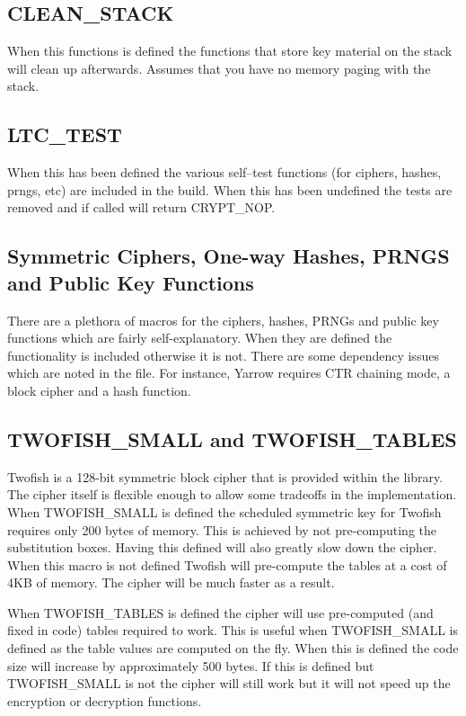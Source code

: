 \documentclass[a4paper]{book}
\begin{document}
\subsection{CLEAN\_STACK}
When this functions is defined the functions that store key material on the stack will clean up afterwards.  
Assumes that you have no memory paging with the stack.

\subsection{LTC\_TEST}
When this has been defined the various self--test functions (for ciphers, hashes, prngs, etc) are included in the build.
When this has been undefined the tests are removed and if called will return CRYPT\_NOP.

\subsection{Symmetric Ciphers, One-way Hashes, PRNGS and Public Key Functions}
There are a plethora of macros for the ciphers, hashes, PRNGs and public key functions which are fairly 
self-explanatory.  When they are defined the functionality is included otherwise it is not.  There are some 
dependency issues which are noted in the file.  For instance, Yarrow requires CTR chaining mode, a block 
cipher and a hash function.

\subsection{TWOFISH\_SMALL and TWOFISH\_TABLES}
Twofish is a 128-bit symmetric block cipher that is provided within the library.  The cipher itself is flexible enough
to allow some tradeoffs in the implementation.  When TWOFISH\_SMALL is defined the scheduled symmetric key for Twofish 
requires only 200 bytes of memory.  This is achieved by not pre-computing the substitution boxes.  Having this 
defined will also greatly slow down the cipher.  When this macro is not defined Twofish will pre-compute the 
tables at a cost of 4KB of memory.  The cipher will be much faster as a result.  

When TWOFISH\_TABLES is defined the cipher will use pre-computed (and fixed in code) tables required to work.  This is
useful when TWOFISH\_SMALL is defined as the table values are computed on the fly.  When this is defined the code size
will increase by approximately 500 bytes.  If this is defined but TWOFISH\_SMALL is not the cipher will still work but
it will not speed up the encryption or decryption functions.
\end{document}
